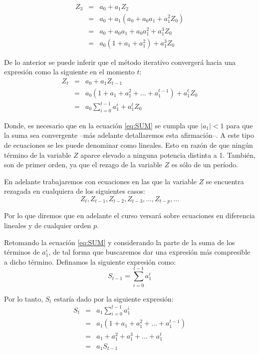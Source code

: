 \documentclass[
]{book}
\begin{document}
\begin{eqnarray*}
Z_3 & = & a_0 + a_1 Z_2 \\
    & = & a_0 + a_1 (a_0 +  a_0 a_1 + a^2_1 Z_0) \\
    & = & a_0 +  a_0 a_1 + a_0 a^2_1 + a^3_1 Z_0 \\
    & = & a_0 (1 + a_1 + a^2_1) + a^3_1 Z_0
\end{eqnarray*}

De lo anterior se puede inferir que el método iterativo convergerá hacia una expresión como la siguiente en el momento \(t\):
\begin{eqnarray}
Z_t & = & a_0 + a_1 Z_{t-1} \nonumber \\
    & = & a_0 (1 + a_1 + a^2_1 + \ldots + a^{t-1}_1) + a^t_1 Z_0 \nonumber \\
    & = & a_0 \sum^{t-1}_{i = 0}{a^i_1} + a^t_1 Z_0
    \label{eq:SUM}
\end{eqnarray}

Donde, es necesario que en la ecuación \eqref{eq:SUM} se cumpla que \(\lvert{a_1}\lvert < 1\) para que la suma sea convergente --más adelante detallaremos esta afirmación--. A este tipo de ecuaciones se les puede denominar como lineales. Esto en razón de que ningún término de la variable \(Z\) aparce elevado a ninguna potencia distinta a 1. También, son de primer orden, ya que el rezago de la variable \(Z\) es sólo de un período.

En adelante trabajaremos con ecuaciones en las que la variable \(Z\) se encuentra rezagada en cualquiera de los siguientes casos:
\begin{equation}
    Z_t, Z_{t-1}, Z_{t-2}, Z_{t-3}, \ldots, Z_{t-p}, \ldots
    \label{eq:SUM0}
\end{equation}

Por lo que diremos que en adelante el curso versará sobre ecuaciones en diferencia lineales y de cualquier orden \(p\).

Retomando la ecuación \eqref{eq:SUM} y considerando la parte de la suma de los términos de \(a^i_1\), de tal forma que buscaremos dar una expresión más compresible a dicho término. Definamos la siguiente expresión como:
\begin{equation}
    S_{t-1} = \sum^{t-1}_{i = 0}{a^i_1}
    \label{eq:St1}
\end{equation}

Por lo tanto, \(S_t\) estaría dado por la siguiente expresión:
\begin{eqnarray}
S_{t} & = & a_1 \sum^{t-1}_{i = 0}{a^i_1} \nonumber \\
      & = & a_1 (1 + a_1 + a^2_1 + \ldots + a^{t-1}_1) \nonumber \\
      & = & a_1 + a^2_1 + a^3_1 + \ldots + a^{t}_1 \nonumber \\
      & = & a_1 S_{t-1}
      \label{eq:St}
\end{eqnarray}
\end{document}
